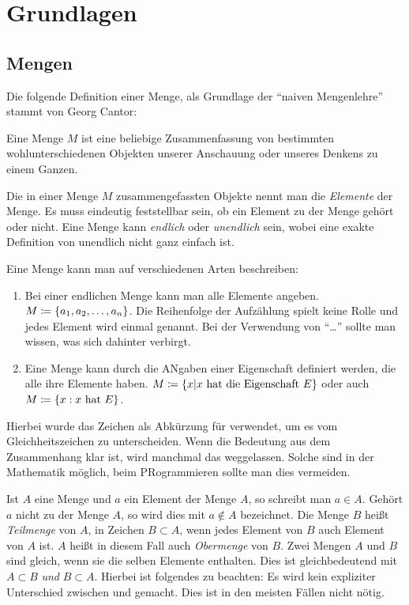 \part{Grundlagen}
\chapter{Mengen}
Die folgende Definition einer Menge, als Grundlage der \enquote{naiven Mengenlehre} stammt von Georg Cantor:
\begin{definition}
Eine Menge $M$ ist eine beliebige Zusammenfassung von bestimmten wohlunterschiedenen Objekten unserer Anschauung oder unseres Denkens zu einem Ganzen.
\end{definition}

\begin{bemerkung}
Die in einer Menge $M$ zusammengefassten Objekte nennt man die \emph{Elemente} der Menge. Es muss eindeutig feststellbar sein, ob ein Element zu der Menge gehört oder nicht. Eine Menge kann \emph{endlich} oder \emph{unendlich} sein, wobei eine exakte Definition von unendlich nicht ganz einfach ist.
\end{bemerkung}

Eine Menge kann man auf verschiedenen Arten beschreiben:
\begin{enumerate}
\item Bei einer endlichen Menge kann man alle Elemente angeben. $M \mathrel{\mathop:\!\!=} \left\{a_1, a_2, \dots, a_n\right\}$. Die Reihenfolge der Aufzählung spielt keine Rolle und jedes Element wird einmal genannt. Bei der Verwendung von \enquote{\dots} sollte man wissen, was sich dahinter verbirgt.
\item Eine Menge kann durch die ANgaben einer Eigenschaft definiert werden, die alle ihre Elemente haben. $M \mathrel{\mathop:\!\!=} \left\{x \vert x \text{ hat die Eigenschaft } E\right\}$ oder auch $M \mathrel{\mathop:\!\!=} \left\{x : x \text{ hat } E\right\}$.
\end{enumerate}

Hierbei wurde das Zeichen \enq{$\ceq$} als Abkürzung für  verwendet, um es vom Gleichheitszeichen \enq{$=$} zu unterscheiden. Wenn die Bedeutung aus dem Zusammenhang klar ist, wird manchmal das \enq{$:$} weggelassen. Solche  sind in der Mathematik möglich, beim PRogrammieren sollte man dies vermeiden.

Ist $A$ eine Menge und $a$ ein Element der Menge $A$, so schreibt man $a \in A$. Gehört $a$ nicht zu der Menge $A$, so wird dies mit $a \notin A$ bezeichnet. Die Menge $B$ heißt \emph{Teilmenge} von $A$, in Zeichen $B \subset A$, wenn jedes Element von $B$ auch Element von $A$ ist. $A$ heißt in diesem Fall auch \emph{Obermenge} von $B$. Zwei Mengen $A$ und $B$ sind gleich, wenn sie die selben Elemente enthalten. Dies ist gleichbedeutend mit $A \subset B$ \emph{und} $B \subset A$. Hierbei ist folgendes zu beachten: Es wird kein expliziter Unterschied zwischen \enq{$\subset$} und \enq{$\subseteq$} gemacht. Dies ist in den meisten Fällen nicht nötig.

